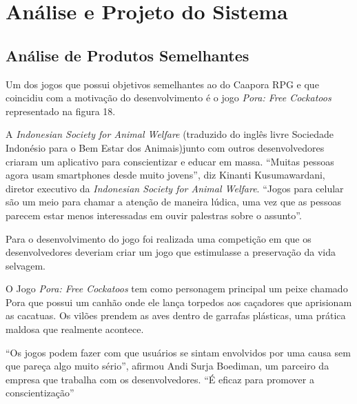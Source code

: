 \chapter{Análise e Projeto do Sistema}
\label{chap:Analise-e-levantamento-de-requisitos}

\section{Análise de Produtos Semelhantes}
\label{sec:analise-de-produtos-semelhantes}

Um dos jogos que possui objetivos semelhantes ao do Caapora RPG e que coincidiu com a motivação do desenvolvimento é o jogo \textit{Pora: Free Cockatoos} representado na figura 18.

A \textit{Indonesian Society for Animal Welfare} (traduzido do inglês livre Sociedade Indonésio para o Bem Estar dos Animais)junto com outros desenvolvedores
criaram um aplicativo para conscientizar e educar em massa. “Muitas pessoas agora usam smartphones desde muito jovens”, diz Kinanti Kusumawardani, diretor executivo da \textit{Indonesian Society for Animal Welfare}. “Jogos para celular são um meio para chamar a atenção de maneira lúdica, uma vez que as pessoas parecem estar menos interessadas em ouvir palestras sobre o assunto”.

Para o desenvolvimento do jogo foi realizada uma competição em que os desenvolvedores deveriam criar um jogo que estimulasse a preservação da vida selvagem.

O Jogo \textit{Pora: Free Cockatoos} tem como personagem principal um peixe chamado Pora que possui um canhão onde ele lança torpedos aos caçadores que aprisionam as cacatuas.
Os vilões prendem as aves dentro de garrafas plásticas, uma prática maldosa que realmente acontece.

“Os jogos podem fazer com que usuários se sintam envolvidos por uma causa sem que pareça algo muito sério”, afirmou Andi Surja Boediman, um parceiro da empresa que trabalha com os desenvolvedores. “É eficaz para promover a conscientização” \cite{anda}

\begin{figure}[h!]
		\centering
	\end{figure}
\pagebreak

